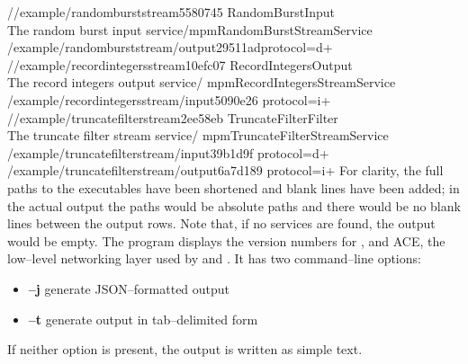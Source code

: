 /\serviceName/example/randomburststream\textunderscore{}5580745\pseudotab{}%
RandomBurst\pseudotab{}Input\pseudotab\\
The random burst input service\pseudotwotabs\textellipsis/mpmRandomBurstStreamService%
\pseudotwotabs\\
/example/randomburststream/output\textunderscore{}29511ad\textbraceleft{}protocol=d+%
\textbraceright\\

/\serviceName/example/recordintegersstream\textunderscore{}10efc07\pseudotab{}%
RecordIntegers\pseudotab{}Output\pseudotab\\
The record integers output service\pseudotwotabs\textellipsis/%
mpmRecordIntegersStreamService\pseudotab\\
/example/recordintegersstream/input\textunderscore{}5090e26\textbraceleft{}%
protocol=i+\textbraceright\\

/\serviceName/example/truncatefilterstream\textunderscore{}2ee58eb\pseudotab{}%
TruncateFilter\pseudotab{}Filter\pseudotab\\
The truncate filter stream service\pseudotwotabs\textellipsis/%
mpmTruncateFilterStreamService\pseudotab\\
/example/truncatefilterstream/input\textunderscore{}39b1d9f\textbraceleft{}%
protocol=d+\textbraceright\pseudotab\\
/example/truncatefilterstream/output\textunderscore{}6a7d189\textbraceleft{}%
protocol=i+\textbraceright
\outputEnd{}
For clarity, the full paths to the executables have been shortened and blank lines have
been added; in the actual output the paths would be absolute paths and there would be no
blank lines between the output rows.
Note that, if no services are found, the output would be empty.
The program  displays the version numbers for \mplusm{}, \yarp{}
and ACE, the low--level networking layer used by \mplusm{} and \yarp{}.
It has two command--line options:
\begin{itemize}
\item \textbf{--j} generate JSON--formatted output
\item \textbf{--t} generate output in tab--delimited form
\end{itemize}
If neither option is present, the output is written as simple text.\\

